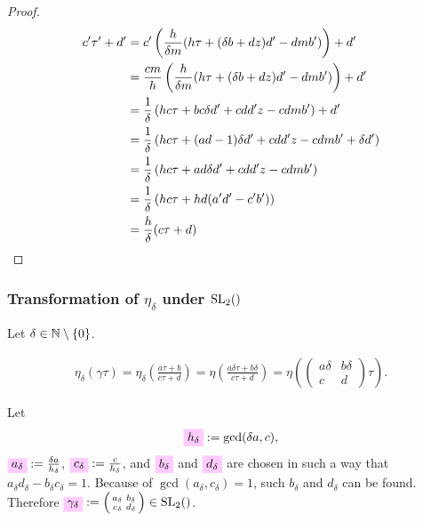 \documentclass{article}
\begin{document}
\begin{proof}
\begin{align*}
  c'\tau'+d'
  &=
  c'
    \left(
    \frac{h}{\delta m}(h\tau + (\delta b + d z) d' - d m b')
    \right) + d'\\
  &=
    \frac{c m}{h}
    \left(
    \frac{h}{\delta m}(h \tau + (\delta b + d z) d' - d m b')
    \right) + d'\\
  &=
    \frac{1}{\delta}
    \left(
    h c \tau + b c \delta d' + c d d' z - c d m b'
    \right) + d'\\
  &=
    \frac{1}{\delta}
    \left(
    h c \tau + (a d - 1) \delta d' + c d d' z - c d m b'
    + \delta d'
    \right)\\
  &=
    \frac{1}{\delta}
    \left(
    h c \tau + a d \delta d' + c d d' z - c d m b'
    \right)\\
  &=
    \frac{1}{\delta}
    \left(
    h c \tau + h d (a' d' - c' b')
    \right)\\
  &=
    \frac{h}{\delta} (c\tau + d)
\end{align*}
\end{proof}
\endgroup

\subsubsection{Transformation of $\eta_\delta$ under $\SL2Z$}
\label{sec:eta_delta-transformation}
Let $\delta \in \mathbb{N}\setminus\left\{0\right\}$.

\begin{gather*}
\eta_\delta(\gamma\tau)
=
\eta_\delta\left(\frac{a\tau+b}{c\tau+d}\right) =
\eta\left(\frac{a\delta\tau+b\delta}{c\tau+d}\right)
=
\eta\left(\begin{pmatrix}a\delta&b\delta\\c&d\end{pmatrix}
  \tau\right).
\end{gather*}

Let
%
\begin{gather}
  \defineNotation[h-delta]{h_\delta}
  :=
  \gcd(\delta a,c), \label{eq:h_delta}
\end{gather}
%
$\defineNotation[a-delta]{a_\delta}:=\frac{\delta a}{h_\delta}$,
%
$\defineNotation[c-delta]{c_\delta}:=\frac{c}{h_\delta}$,
%
and $\defineNotation[b-delta]{b_\delta}$ and
$\defineNotation[d-delta]{d_\delta}$ are chosen in such a way that
$a_\delta d_\delta - b_\delta c_\delta = 1$.
%
Because of $\gcd(a_\delta, c_\delta)=1$, such $b_\delta$ and $d_\delta$
can be found.
%
Therefore
  $\defineNotation[gamma-delta]{\gamma_\delta} := \left(
  \begin{smallmatrix}a_\delta&b_\delta\\c_\delta&d_\delta\end{smallmatrix}
\right)\in \SL2Z$.
\end{document}
